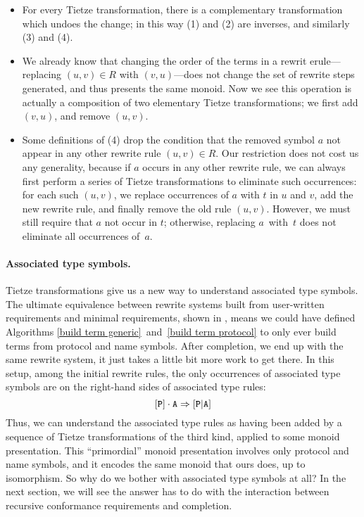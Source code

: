 \documentclass[../generics]{subfiles}
\begin{document}
\begin{itemize}
\item For every Tietze transformation, there is a complementary transformation which undoes the change; in this way (1) and (2) are inverses, and similarly (3) and (4).

\item We already know that changing the order of the terms in a rewrit erule---replacing $(u,v)\in R$ with $(v,u)$---does not change the set of rewrite steps generated, and thus presents the same monoid. Now we see this operation is actually a composition of two elementary Tietze transformations; we first add $(v,u)$, and remove $(u,v)$.

\item Some definitions of (4) drop the condition that the removed symbol $a$ not appear in any other rewrite rule $(u,v)\in R$. Our restriction does not cost us any generality, because if $a$ occurs in any other rewrite rule, we can always first perform a series of Tietze transformations to eliminate such occurrences: for each such $(u,v)$, we replace occurrences of $a$ with $t$ in $u$ and $v$, add the new rewrite rule, and finally remove the old rule $(u,v)$. However, we must still require that $a$ not occur in $t$; otherwise, replacing $a$~with~$t$ does not eliminate all occurrences of~$a$.
\end{itemize}

\paragraph{Associated type symbols.} Tietze transformations give us a new way to understand associated type symbols. The ultimate equivalence between rewrite systems built from user-written requirements and minimal requirements, shown in , means we could have defined Algorithms \ref{build term generic}~and~\ref{build term protocol} to only ever build terms from protocol and name symbols. After completion, we end up with the same rewrite system, it just takes a little bit more work to get there. In this setup, among the initial rewrite rules, the only occurrences of associated type symbols are on the right-hand sides of associated type rules:
\[[\texttt{P}]\cdot\texttt{A}\Rightarrow[\texttt{P}|\texttt{A}]\]
Thus, we can understand the associated type rules as having been added by a sequence of Tietze transformations of the third kind, applied to some monoid presentation. This ``primordial'' monoid presentation involves only protocol and name symbols, and it encodes the same monoid that ours does, up to isomorphism. So why do we bother with associated type symbols at all? In the next section, we will see the answer has to do with the interaction between recursive conformance requirements and completion.
\end{document}
